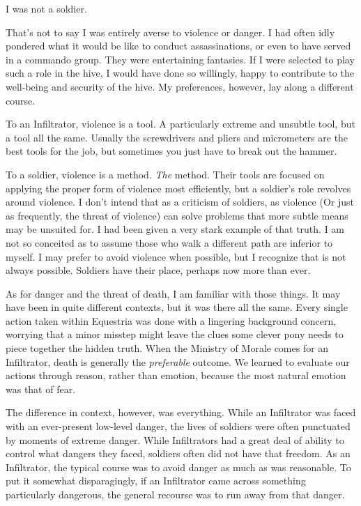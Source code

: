 I was not a soldier.

That’s not to say I was entirely averse to violence or danger. I had often idly pondered what it would be like to conduct assassinations, or even to have served in a commando group. They were entertaining fantasies. If I were selected to play such a role in the hive, I would have done so willingly, happy to contribute to the well-being and security of the hive. My preferences, however, lay along a different course.

To an Infiltrator, violence is a tool. A particularly extreme and unsubtle tool, but a tool all the same. Usually the screwdrivers and pliers and micrometers are the best tools for the job, but sometimes you just have to break out the hammer.

To a soldier, violence is a method. \textit{The} method. Their tools are focused on applying the proper form of violence most efficiently, but a soldier’s role revolves around violence. I don’t intend that as a criticism of soldiers, as violence (Or just as frequently, the threat of violence) can solve problems that more subtle means may be unsuited for. I had been given a very stark example of that truth. I am not so conceited as to assume those who walk a different path are inferior to myself. I may prefer to avoid violence when possible, but I recognize that is not always possible. Soldiers have their place, perhaps now more than ever.

As for danger and the threat of death, I am familiar with those things. It may have been in quite different contexts, but it was there all the same. Every single action taken within Equestria was done with a lingering background concern, worrying that a minor misstep might leave the clues some clever pony needs to piece together the hidden truth. When the Ministry of Morale comes for an Infiltrator, death is generally the \textit{preferable} outcome. We learned to evaluate our actions through reason, rather than emotion, because the most natural emotion was that of fear.

The difference in context, however, was everything. While an Infiltrator was faced with an ever-present low-level danger, the lives of soldiers were often punctuated by moments of extreme danger. While Infiltrators had a great deal of ability to control what dangers they faced, soldiers often did not have that freedom. As an Infiltrator, the typical course was to avoid danger as much as was reasonable. To put it somewhat disparagingly, if an Infiltrator came across something particularly dangerous, the general recourse was to run away from that danger.

